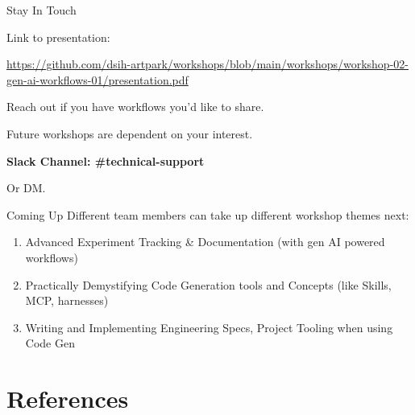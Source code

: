 \documentclass{beamer}
\begin{document}
\begin{frame}{Stay In Touch}
\begin{center}
\small
{\footnotesize Link to presentation:}

{\tiny \url{https://github.com/dsih-artpark/workshops/blob/main/workshops/workshop-02-gen-ai-workflows-01/presentation.pdf}}

\vspace{1.6em}
Reach out if you have workflows you'd like to share.

\vspace{0.8em}
Future workshops are dependent on your interest.

\vspace{1.2em}
\textbf{Slack Channel: \#technical-support}

\vspace{0.6em}
Or DM.
\end{center}
\end{frame}


\begin{frame}{Coming Up}
Different team members can take up different workshop themes next:

\vspace{1em}
\begin{enumerate}
    \item Advanced Experiment Tracking \& Documentation (with gen AI powered workflows)
    \pause
    \item Practically Demystifying Code Generation tools and Concepts (like Skills, MCP, harnesses)
    \pause
    \item Writing and Implementing Engineering Specs, Project Tooling when using Code Gen
\end{enumerate}
\end{frame}


\section{References}
\end{document}
